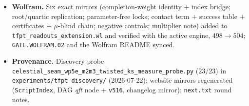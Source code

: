 \documentclass[11pt]{article}
\begin{document}
\begin{itemize}[leftmargin=1.5em]
square'' --- on the way to the eighteen-step story).
\texttt{v516\_celestial\_wp5e\_m2\_twisted\_ks\_measure.py} is cited via \texttt{veri} in both.
\item \textbf{Wolfram.} Six exact mirrors (completion-weight identity $+$ index bridge;
root/quartic replication; parameter-free locks; contact term $+$ success table $+$ certificates
$+$ $\mu$-blind chain; negative controls; multiplier note) added to
\texttt{tfpt\_readouts\_extension.wl} and verified with the active engine, $498\to504$;
\texttt{GATE.WOLFRAM.02} and the Wolfram README synced.
\item \textbf{Provenance.} Discovery probe
\texttt{celestial\_seam\_}\allowbreak\texttt{wp5e\_m2m3\_}\allowbreak\texttt{twisted\_ks\_measure\_probe.py}
($23/23$) in \texttt{experiments/tfpt-discovery/} (2026-07-22); website mirrors regenerated
(\texttt{ScriptIndex}, DAG \emph{qft} node $+$ \texttt{v516}, changelog mirror); \texttt{next.txt}
round notes.
\end{itemize}
\end{document}
